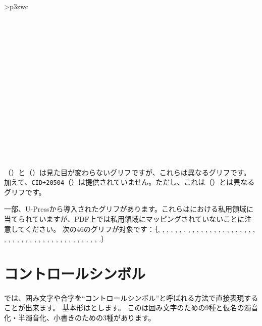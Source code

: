 \documentclass[uplatex, dvipdfmx, paper=a4paper, line_length=45zw, head_space=7zw, foot_space=10zw]{jlreq}
\begin{document}
\begin{center}
{\begin{booktabular}{>{\ttfamily\small}p{3zw}c}
       \\
     \\
       \\
      \\
       \\
       \\
       \\
     \\
      \\
      \\
      \\
      \\
      \\
      \\
      \\
     \\
  \end{booktabular}}
\end{center}

（{\ibmfamily{}}）と（{\ibmfamily{}}）は見た目が変わらないグリフですが、これらは異なるグリフです。
加えて、\texttt{CID+20504}（{\ibmfamily{}}）は提供されていません。ただし、これは（{\ibmfamily{}}）とは異なるグリフです。

一部、U-Pressから導入されたグリフがあります。これらは{\Unicode}における私用領域に当てられていますが、PDF上では私用領域にマッピングされていないことに注意してください。
次の46のグリフが対象です：｛{\ibmfamily{}, , , , , , , , , , , , , , , , , , , , , , , , , , , , , , , , , , , , , , , , , , , , , .}｝

\newpage
\section{コントロールシンボル}

では、囲み文字や合字を``コントロールシンボル''と呼ばれる方法で直接表現することが出来ます。
基本形はとします。
このは囲み文字のための9種と仮名の濁音化・半濁音化、小書きのための3種があります。
\end{document}
